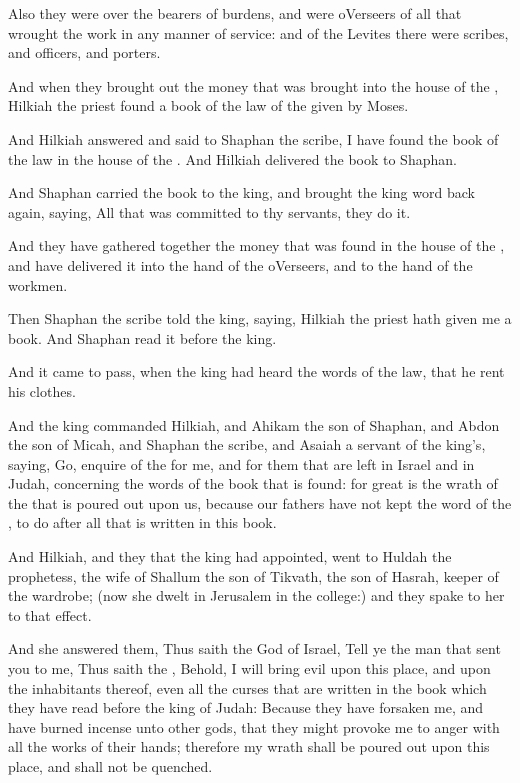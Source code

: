 \Verse Also they were over the bearers of burdens, and were oVerseers of all that wrought the work in any manner of service: and of the Levites there were scribes, and officers, and porters.

\Verse And when they brought out the money that was brought into the house of the \LORD, Hilkiah the priest found a book of the law of the \LORD given by Moses.

\Verse And Hilkiah answered and said to Shaphan the scribe, I have found the book of the law in the house of the \LORD. And Hilkiah delivered the book to Shaphan.

\Verse And Shaphan carried the book to the king, and brought the king word back again, saying, All that was committed to thy servants, they do it.

\Verse And they have gathered together the money that was found in the house of the \LORD, and have delivered it into the hand of the oVerseers, and to the hand of the workmen.

\Verse Then Shaphan the scribe told the king, saying, Hilkiah the priest hath given me a book. And Shaphan read it before the king.

\Verse And it came to pass, when the king had heard the words of the law, that he rent his clothes.

\Verse And the king commanded Hilkiah, and Ahikam the son of Shaphan, and Abdon the son of Micah, and Shaphan the scribe, and Asaiah a servant of the king's, saying, \Verse Go, enquire of the \LORD for me, and for them that are left in Israel and in Judah, concerning the words of the book that is found: for great is the wrath of the \LORD that is poured out upon us, because our fathers have not kept the word of the \LORD, to do after all that is written in this book.

\Verse And Hilkiah, and they that the king had appointed, went to Huldah the prophetess, the wife of Shallum the son of Tikvath, the son of Hasrah, keeper of the wardrobe; (now she dwelt in Jerusalem in the college:) and they spake to her to that effect.

\Verse And she answered them, Thus saith the \LORD God of Israel, Tell ye the man that sent you to me, \Verse Thus saith the \LORD, Behold, I will bring evil upon this place, and upon the inhabitants thereof, even all the curses that are written in the book which they have read before the king of Judah: \Verse Because they have forsaken me, and have burned incense unto other gods, that they might provoke me to anger with all the works of their hands; therefore my wrath shall be poured out upon this place, and shall not be quenched.

